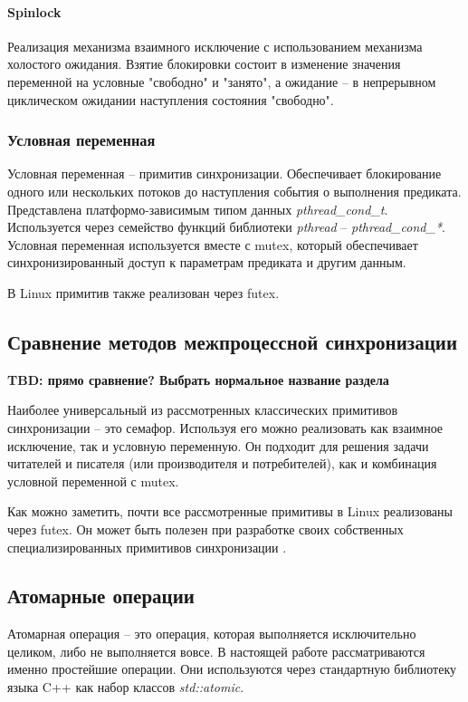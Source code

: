 \paragraph{Spinlock}
Реализация механизма взаимного исключение с использованием механизма холостого ожидания. Взятие блокировки состоит в изменение значения переменной на условные "свободно" и "занято", а ожидание -- в непрерывном циклическом ожидании наступления состояния "свободно".

\subsubsection{Условная переменная}

Условная переменная -- примитив синхронизации. Обеспечивает блокирование одного или нескольких потоков до наступления события о выполнения предиката. Представлена платформо-зависимым типом данных \textit{pthread\_cond\_t}. Используется через семейство функций библиотеки \textit{pthread} -- \textit{pthread\_cond\_*}. Условная переменная используется вместе с mutex, который обеспечивает синхронизированный доступ к параметрам предиката и другим данным.

В Linux примитив также реализован через futex.

\subsection{Сравнение методов межпроцессной синхронизации}

\textbf{TBD: прямо сравнение? Выбрать нормальное название раздела}

Наиболее универсальный из рассмотренных классических примитивов синхронизации -- это семафор. Используя его можно реализовать как взаимное исключение, так и условную переменную. Он подходит для решения задачи читателей и писателя (или производителя и потребителей), как и комбинация условной переменной с mutex.

Как можно заметить, почти все рассмотренные примитивы в Linux реализованы через futex. Он может быть полезен при разработке своих собственных специализированных примитивов синхронизации \cite{FutexesAreTricky}.

\subsection{Атомарные операции}

Атомарная операция -- это операция, которая выполняется исключительно целиком, либо не выполняется вовсе. В настоящей работе рассматриваются именно простейшие операции. Они используются через стандартную библиотеку языка C++ как набор классов \textit{std::atomic}.

